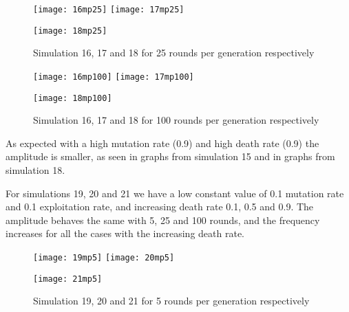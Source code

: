 \documentclass{book}
\begin{document}
\begin{figure}[H]       
    \begin{center}
    \mbox{\texttt{[image: 16mp25]}}   
    \hspace{0px}
    \mbox{\texttt{[image: 17mp25]}}
    \hspace{40px}
    \end{center}
    \begin{center}
    \mbox{\texttt{[image: 18mp25]}}
    \end{center}
    \caption{Simulation 16, 17 and 18 for 25 rounds per generation respectively}
    \label{simulation161718mp25}
\end{figure}

\begin{figure}[H]       
    \begin{center}
    \mbox{\texttt{[image: 16mp100]}}   
    \hspace{0px}
    \mbox{\texttt{[image: 17mp100]}}
    \hspace{40px}
    \end{center}
    \begin{center}
    \mbox{\texttt{[image: 18mp100]}}
    \end{center}
    \caption{Simulation 16, 17 and 18 for 100 rounds per generation respectively}
    \label{simulation161718mp100}
\end{figure}
As expected with a high mutation rate (0.9) and high death rate (0.9) the amplitude is smaller, as seen in graphs from simulation 15 and in graphs from simulation 18.

For simulations 19, 20 and 21 we have a low constant value of 0.1 mutation rate and 0.1 exploitation rate, and increasing death rate 0.1, 0.5 and 0.9. The amplitude behaves the same with 5, 25 and 100 rounds, and the frequency increases for all the cases with the increasing death rate.

\begin{figure}[H]       
    \begin{center}
    \mbox{\texttt{[image: 19mp5]}}   
    \hspace{0px}
    \mbox{\texttt{[image: 20mp5]}}
    \hspace{40px}
    \end{center}
    \begin{center}
    \mbox{\texttt{[image: 21mp5]}}
    \end{center}
    \caption{Simulation 19, 20 and 21 for 5 rounds per generation respectively}
    \label{simulation192021mp5}
\end{figure}
\end{document}
